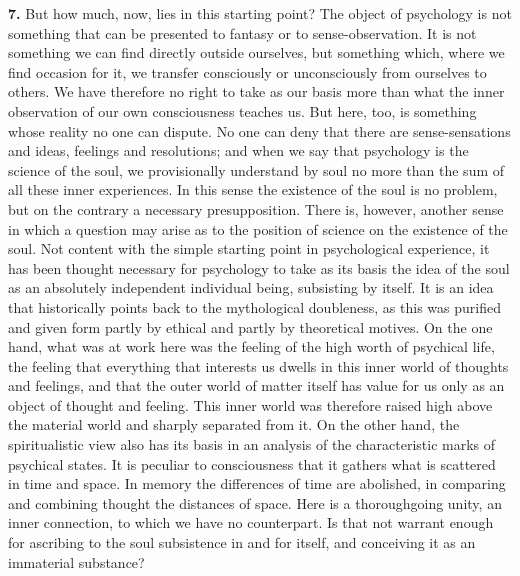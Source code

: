 \documentclass[12pt,a4paper]{book}
\newcommand{\opage}[1]{\marginnote{\footnotesize\textit{[#1]}}}
\begin{document}
\textbf{7.} But how much, now, lies in this starting point? The object
of psychology is not something that can be presented to fantasy or to
sense-observation. It is not something we can find directly outside
ourselves, but something which, where we find occasion for it, we
transfer consciously or unconsciously from ourselves to others. We have
therefore no right to take as our basis more than what the inner
observation of our own consciousness teaches us. But here, too, is
something whose reality no one can
\opage{14}dispute. No one can deny that there are sense-sensations and
ideas, feelings and resolutions; and when we say that psychology is the
science of the soul, we provisionally understand by soul no more than
the sum of all these inner experiences. In this sense the existence of
the soul is no problem, but on the contrary a necessary presupposition.
There is, however, another sense in which a question may arise as to the
position of science on the existence of the soul. Not content with the
simple starting point in psychological experience, it has been thought
necessary for psychology to take as its basis the idea of the soul as an
absolutely independent individual being, subsisting by itself. It is an
idea that historically points back to the mythological doubleness, as
this was purified and given form partly by ethical and partly by
theoretical motives. On the one hand, what was at work here was the
feeling of the high worth of psychical life, the feeling that everything
that interests us dwells in this inner world of thoughts and feelings,
and that the outer world of matter itself has value for us only as an
object of thought and feeling. This inner world was therefore raised
high above the material world and sharply separated from it. On the
other hand, the spiritualistic view also has its basis in an analysis of
the characteristic marks of psychical states. It is peculiar to
consciousness that it gathers what is scattered in time and space. In
memory the differences of time are abolished, in comparing and combining
thought the distances of space. Here is a thoroughgoing unity, an inner
connection, to which we have no counterpart. Is that not warrant enough
for ascribing to the soul subsistence in and for itself, and conceiving
it as an immaterial substance?
\end{document}
